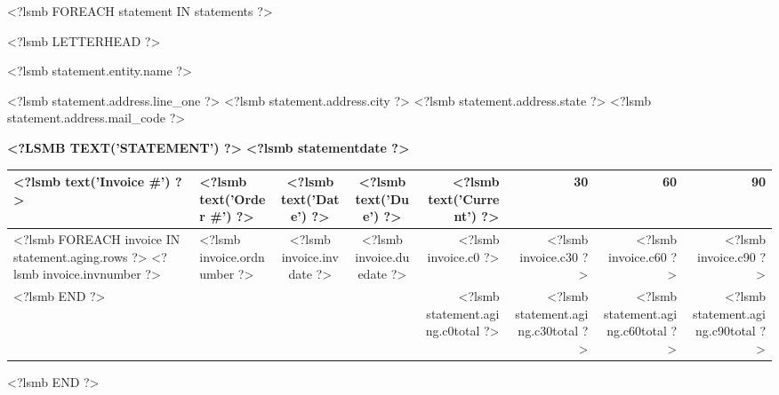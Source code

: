 \documentclass{scrartcl}
\begin{document}
<?lsmb FOREACH statement IN statements ?>
\pagestyle{myheadings}
\thispagestyle{empty}

\fontsize{10pt}{12pt}\selectfont

<?lsmb LETTERHEAD ?>

\parbox[t]{.5\textwidth}{
<?lsmb statement.entity.name ?>

<?lsmb statement.address.line_one ?>
<?lsmb statement.address.city ?> <?lsmb statement.address.state ?>
<?lsmb statement.address.mail_code ?>
}
\hfill

\vspace{1cm}

\textbf{\MakeUppercase{<?lsmb text('Statement') ?>}} \hfill
\textbf{<?lsmb statementdate ?>}

\vspace{2cm}

\begin{tabular*}{\textwidth}{|ll@{\extracolsep\fill}ccrrrr|}
  \hline
  \textbf{<?lsmb text('Invoice #') ?>} & \textbf{<?lsmb text('Order #') ?>}
  & \textbf{<?lsmb text('Date') ?>} & \textbf{<?lsmb text('Due') ?>} &
  \textbf{<?lsmb text('Current') ?>} & \textbf{30} & \textbf{60} & \textbf{90} \\
  \hline
<?lsmb FOREACH invoice IN statement.aging.rows ?>
  <?lsmb invoice.invnumber ?> &
  <?lsmb invoice.ordnumber ?> &
  <?lsmb invoice.invdate ?> &
  <?lsmb invoice.duedate ?> &
  <?lsmb invoice.c0 ?> &
  <?lsmb invoice.c30 ?> &
  <?lsmb invoice.c60 ?> &
  <?lsmb invoice.c90 ?> \\
<?lsmb END ?>
\hline
 & & & &
 <?lsmb statement.aging.c0total ?> &
 <?lsmb statement.aging.c30total ?> &
 <?lsmb statement.aging.c60total ?> &
 <?lsmb statement.aging.c90total ?> \\
\hline
\end{tabular*}

\vspace{0.5cm}

\hfill
\pagebreak
<?lsmb END ?>
\end{document}

